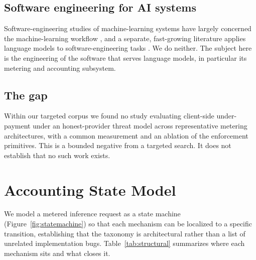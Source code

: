 \documentclass[preprint,3p,authoryear,12pt]{elsarticle}
\begin{document}
\subsection{Software engineering for AI systems}
Software-engineering studies of machine-learning systems have largely concerned the
machine-learning workflow \citep{amershi}, and a separate, fast-growing literature applies
language models to software-engineering tasks \citep{fan,hou}. We do neither. The subject
here is the engineering of the software that serves language models, in particular its
metering and accounting subsystem.

\subsection{The gap}
Within our targeted corpus we found no study evaluating client-side under-payment under
an honest-provider threat model across representative metering architectures, with a
common measurement and an ablation of the enforcement primitives. This is a bounded
negative from a targeted search. It does not establish that no such work exists.

\section{Accounting State Model}
\label{sec:statemodel}
We model a metered inference request as a state machine (Figure~\ref{fig:statemachine})
so that each mechanism can be localized to a specific transition, establishing that the
taxonomy is architectural rather than a list of unrelated implementation bugs.
Table~\ref{tab:structural} summarizes where each mechanism sits and what closes it.
\end{document}
